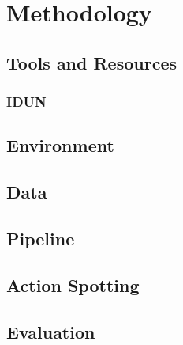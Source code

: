 \chapter{Methodology}
\label{chap:methodology}

\section{Tools and Resources}

\subsection{IDUN}

\section{Environment}

\section{Data}

\section{Pipeline}

\section{Action Spotting}

\section{Evaluation}

